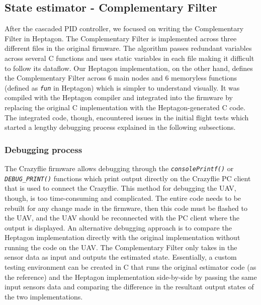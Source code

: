 \documentclass[10pt, a4paper]{article}
\newcommand{\textFunc}[1]{\texttt{\textit{#1}}}
\begin{document}
    \subsection{State estimator - Complementary Filter}
    After the cascaded PID controller, we focused on writing the Complementary Filter in Heptagon. The Complementary Filter is implemented across three different files in the original firmware. The algorithm passes redundant variables across several C functions and uses static variables in each file making it difficult to follow its dataflow. Our Heptagon implementation, on the other hand, defines the Complementary Filter across $6$ main nodes and $6$ memoryless functions (defined as \textFunc{fun} in Heptagon) which is simpler to understand visually. It was compiled with the Heptagon compiler and integrated into the firmware by replacing the original C implementation with the Heptagon-generated C code. The integrated code, though, encountered issues in the initial flight tests which started a lengthy debugging process explained in the following subsections.

    \subsubsection{Debugging process}
    The Crazyflie firmware allows debugging through the \textFunc{consolePrintf()} or \textFunc{DEBUG\_PRINT()} functions which print output directly on the Crazyflie PC client \cite{software:crazyflie-clients-python} that is used to connect the Crazyflie. This method for debugging the UAV, though, is too time-consuming and complicated. The entire code needs to be rebuilt for any change made in the firmware, then this code must be flashed to the UAV, and the UAV should be reconnected with the PC client where the output is displayed. An alternative debugging approach is to compare the Heptagon implementation directly with the original implementation without running the code on the UAV. The Complementary Filter only takes in the sensor data as input and outputs the estimated state. Essentially, a custom testing environment can be created in C that runs the original estimator code (as the reference) and the Heptagon implementation side-by-side by passing the same input sensors data and comparing the difference in the resultant output states of the two implementations.
\end{document}
